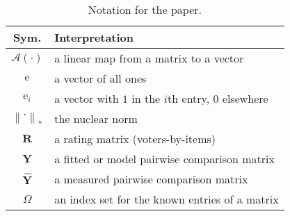 \documentclass{sig-alternate}
\newcommand{\sA}{\mathcal{A}}
\newcommand{\mat}{\boldsymbol}
\renewcommand{\vec}[1]{\boldsymbol{\mathrm{#1}}}
\providecommand{\mYhat}{\ensuremath{\mat{\hat{\mY}}}}
\providecommand{\mR}{\ensuremath{\mat{R}}}
\providecommand{\mY}{\ensuremath{\mat{Y}}}
\providecommand{\ve}{\ensuremath{\vec{e}}}
\newcommand{\sstretchsym}[3]{\ensuremath{\left#1 #3 \right#2}}
\newcommand{\normof}[2][]{\sstretchsym{\|}{\|}{#2}_{#1}}
\begin{document}
\begin{table}
\caption{Notation for the paper.}
\label{tab:notation}
\setlength{\tabcolsep}{1ex}
\renewcommand{\arraystretch}{1.2}
\begin{tabularx}{\linewidth}{cX}
\toprule
  \textbf{Sym.} & \textbf{Interpretation} 
\\ \midrule
   $\sA(\cdot)$ & a linear map from a matrix to a vector 
\\ $\ve$ & a vector of all ones
\\ $\ve_i$ & a vector with $1$ in the $i$th entry, 0 elsewhere
\\ $\normof[*]{\cdot}$ & the nuclear norm
\\ $\mR$ & a rating matrix (voters-by-items)
\\ $\mY$ & a fitted or model pairwise comparison matrix 
\\ $\mYhat$ & a measured pairwise comparison matrix
\\ $\Omega$ & an index set for the known entries of a matrix
\\ \bottomrule
\end{tabularx}
\end{table}
\end{document}
